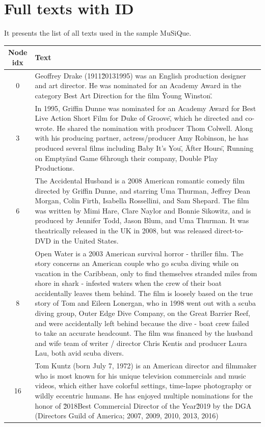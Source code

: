\documentclass[11pt]{article}
\begin{document}
\section{Full texts with ID}
\label{appendix:list_text}


It presents the list of all texts used in the sample MuSiQue.
\begin{table}[t]
\centering
\begin{tabularx}{\textwidth}{c X}
\toprule
Node idx & Text \\
\midrule
0 & Geoffrey Drake (1911\u20131995) was an English production designer and art director. He was nominated for an Academy Award in the category Best Art Direction for the film \"Young Winston\".\\
3 & In 1995, Griffin Dunne was nominated for an Academy Award for Best Live Action Short Film for \"Duke of Groove\", which he directed and co-wrote. He shared the nomination with producer Thom Colwell. Along with his producing partner, actress/producer Amy Robinson, he has produced several films including \"Baby It's You\", \"After Hours\", \"Running on Empty\" and \"Game 6\" through their company, Double Play Productions.\\
6 & The Accidental Husband is a 2008 American romantic comedy film directed by Griffin Dunne, and starring Uma Thurman, Jeffrey Dean Morgan, Colin Firth, Isabella Rossellini, and Sam Shepard. The film was written by Mimi Hare, Clare Naylor and Bonnie Sikowitz, and is produced by Jennifer Todd, Jason Blum, and Uma Thurman. It was theatrically released in the UK in 2008, but was released direct-to-DVD in the United States.\\
8 & Open Water is a 2003 American survival horror - thriller film. The story concerns an American couple who go scuba diving while on vacation in the Caribbean, only to find themselves stranded miles from shore in shark - infested waters when the crew of their boat accidentally leaves them behind. The film is loosely based on the true story of Tom and Eileen Lonergan, who in 1998 went out with a scuba diving group, Outer Edge Dive Company, on the Great Barrier Reef, and were accidentally left behind because the dive - boat crew failed to take an accurate headcount. The film was financed by the husband and wife team of writer / director Chris Kentis and producer Laura Lau, both avid scuba divers. \\

16 & Tom Kuntz (born July 7, 1972) is an American director and filmmaker who is most known for his unique television commercials and music videos, which either have colorful settings, time-lapse photography or wildly eccentric humans. He has enjoyed multiple nominations for the honor of \u2018Best Commercial Director of the Year\u2019 by the DGA (Directors Guild of America; 2007, 2009, 2010, 2013, 2016)\\


\end{tabularx}
\end{table}
\end{document}
